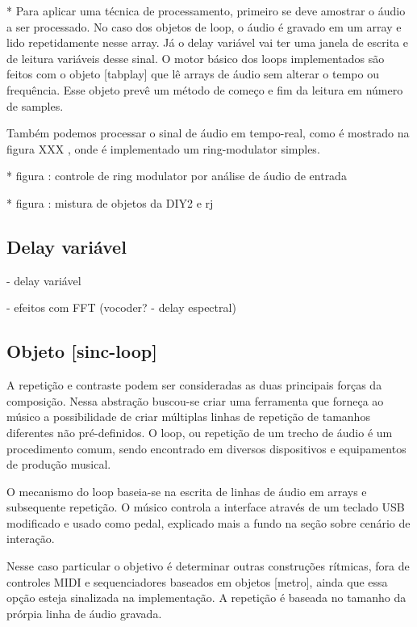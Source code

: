 \documentclass{ppgmus}
\begin{document}
* Para aplicar uma técnica de processamento, primeiro se deve amostrar
o áudio a ser processado. No caso dos objetos de loop, o áudio é gravado
em um array e lido repetidamente nesse array. Já o delay variável vai ter uma
janela de escrita e de leitura variáveis desse sinal. O motor básico dos loops 
implementados são feitos com o objeto [tabplay\texttildelow] que lê arrays
de áudio sem alterar o tempo ou frequência. Esse objeto prevê um método de começo e fim
da leitura em número de samples.

Também podemos processar o sinal de áudio em tempo-real, como é mostrado na 
figura XXX , onde é implementado um ring-modulator simples.



* figura : controle de ring modulator por análise de áudio de entrada

* figura : mistura de objetos da DIY2 e rj


\subsection{Delay variável}


- delay variável

- efeitos com FFT (vocoder? - delay espectral)



\subsection{Objeto [sinc-loop]}


A repetição e contraste podem ser consideradas as duas principais forças
da composição. Nessa abstração buscou-se criar uma ferramenta que forneça ao músico 
a possibilidade de criar múltiplas linhas de repetição de tamanhos diferentes não pré-definidos.
O loop, ou repetição de um trecho de áudio é um procedimento comum,
sendo encontrado em diversos dispositivos e equipamentos de produção musical.


O mecanismo do loop baseia-se na escrita de linhas de áudio em arrays e subsequente
repetição. O músico controla a interface através de um teclado USB modificado e 
usado como pedal, explicado mais a fundo na seção sobre cenário de interação.

Nesse caso particular o objetivo é determinar outras construções rítmicas,
fora de controles MIDI e sequenciadores baseados em objetos [metro], ainda que essa opção
esteja sinalizada na implementação. A repetição
é baseada no tamanho da prórpia linha de áudio gravada.
\end{document}

